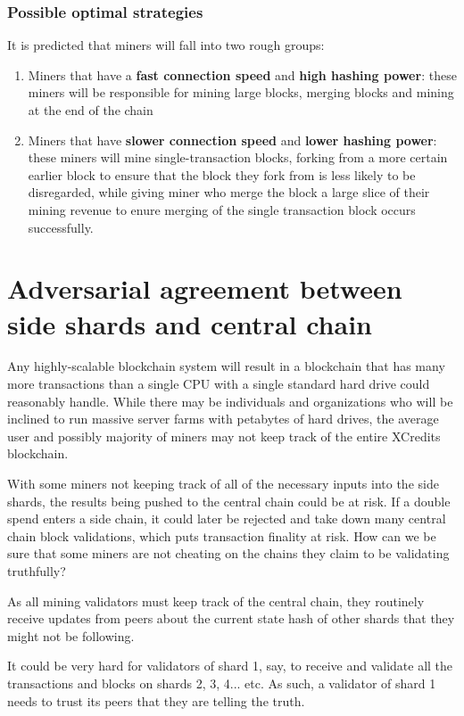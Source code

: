 \documentclass[a4paper,12pt]{article}
\begin{document}
\subsubsection{Possible optimal strategies}
It is predicted that miners will fall into two rough groups:
\begin{enumerate}
\item Miners that have a \textbf{fast connection speed} and \textbf{high hashing power}: these miners will be responsible for mining large blocks, merging blocks and mining at the end of the chain
\item Miners that have \textbf{slower connection speed} and \textbf{lower hashing power}: these miners will mine single-transaction blocks, forking from a more certain earlier block to ensure that the block they fork from is less likely to be disregarded, while giving miner who merge the block a large slice of their mining revenue to enure merging of the single transaction block occurs successfully. 
\end{enumerate}








\section{Adversarial agreement between side shards and central chain}
Any highly-scalable blockchain system will result in a blockchain that has many more transactions than a single CPU with a single standard hard drive could reasonably handle. While there may be individuals and organizations who will be inclined to run massive server farms with petabytes of hard drives, the average user and possibly majority of miners may not keep track of the entire XCredits blockchain. 

With some miners not keeping track of all of the necessary inputs into the side shards, the results being pushed to the central chain could be at risk. If a double spend enters a side chain, it could later be rejected and take down many central chain block validations, which puts transaction finality at risk. How can we be sure that some miners are not cheating on the chains they claim to be validating truthfully?

As all mining validators must keep track of the central chain, they routinely receive updates from peers about the current state hash of other shards that they might not be following. 

It could be very hard for validators of shard 1, say, to receive and validate all the transactions and blocks on shards 2, 3, 4... etc. As such, a validator of shard 1 needs to trust its peers that they are telling the truth. 
\end{document}
